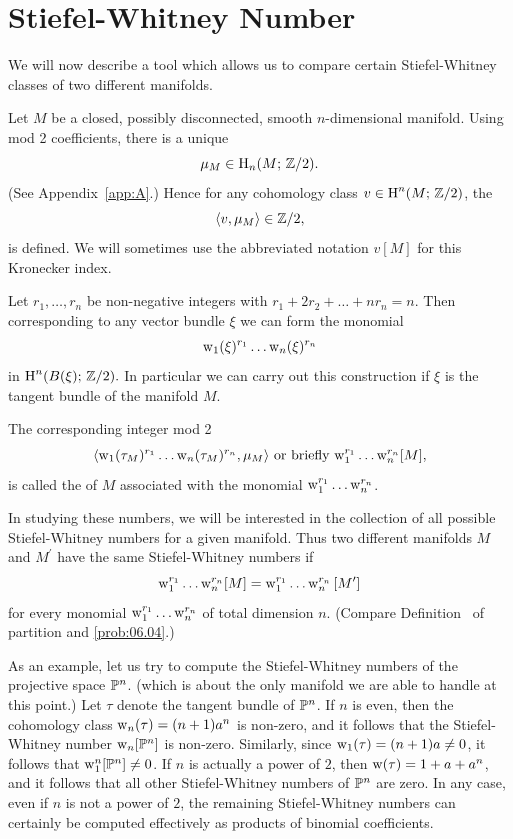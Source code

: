 \documentclass[../main]{subfiles}
\begin{document}
\section{Stiefel-Whitney Number}\label{sec:4.4}

We will now describe a tool which allows us to compare certain Stiefel-Whitney classes of two different manifolds.

Let $M$ be a closed, possibly disconnected, smooth $n$-dimensional manifold. Using mod 2 coefficients, there is a unique 
\[
\mu_{M} \in \operatorname{H}_{n}(M ; \, \mathbb{Z} / 2).
\]
(See Appendix~\ref{app:A}.) Hence for any cohomology class $v \in \operatorname{H}^{n}(M ; \, \mathbb{Z} / 2)$, the 
\[
\langle v,\mu_{M}\rangle \in \mathbb{Z} / 2,
\]
is defined. We will sometimes use the abbreviated notation $v[M]$ for this Kronecker index.

Let $r_{1}, \dots, r_{n}$ be non-negative integers with $r_{1}+2 r_{2}+\dots+n r_{n}=n$. Then corresponding to any vector bundle $\xi$ we can form the monomial
\[
\operatorname{w}_{1}(\xi)^{r_{1}} \dots \operatorname{w}_{n}(\xi)^{r_{n}}
\]
in $\operatorname{H}^{n}(B(\xi) ;\, \mathbb{Z} / 2) .$ In particular we can carry out this construction if $\xi$ is the tangent bundle of the manifold $M$.

\begin{definition}
\label{def:04.02}
The corresponding integer mod 2
\[
\langle\operatorname{w}_{1}(\tau_{M})^{r_1} \dots \operatorname{w}_{n}(\tau_{M})^{r_n}, \mu_{M}\rangle
\text{ or briefly }
{\operatorname{w}}_{1}^{r_1} \dots \operatorname{w}_{n}^{r_n}[M],
\]
is called the  of $M$ associated with the monomial $\operatorname{w}_{1}^{r_{1}} \dots \operatorname{w}_{n}^{r_n}$.
\end{definition}

In studying these numbers, we will be interested in the collection of all possible Stiefel-Whitney numbers for a given manifold. Thus two different manifolds $M$ and $M^{\prime}$ have the same Stiefel-Whitney numbers if 
\[
\operatorname{w}_{1}^{r_{1}} \dots \operatorname{w}_{n}^{r_{n}} [M]=\operatorname{w}_{1}^{r_{1}} \dots \operatorname{w}_{n} ^{r_n}{[M^{\prime}]}
\]
for every monomial ${\operatorname{w}}_{1}^{r_{1}} \dots \operatorname{w}_{n}^{r_n}$ of total dimension $n$. (Compare Definition~\pageref{def:06.06} of partition and \ref{prob:06.04}.)

As an example, let us try to compute the Stiefel-Whitney numbers of the projective space $\mathbb{P}^{n}$. (which is about the only manifold we are able to handle at this point.) Let $\tau$ denote the tangent bundle of $\mathbb{P}^{n}$. If $n$ is even, then the cohomology class $\operatorname{w}_{n}(\tau)=(n+1) a^{n}$ is non-zero, and it follows that the Stiefel-Whitney number $\operatorname{w}_{n}[\mathbb{P}^{n}]$ is non-zero. Similarly, since $\operatorname{w}_{1}(\tau)=(n+1) a \neq 0$, it follows that $\operatorname{w}_{1}^{n}[\mathbb{P}^{n}] \neq 0$. If $n$ is actually a power of $2$, then $\operatorname{w}(\tau)=1+a+a^{n}$, and it follows that all other Stiefel-Whitney numbers of $\mathbb{P}^{n}$ are zero. In any case, even if $n$ is not a power of $2$, the remaining Stiefel-Whitney numbers can certainly be computed effectively as products of binomial coefficients.
\end{document}

